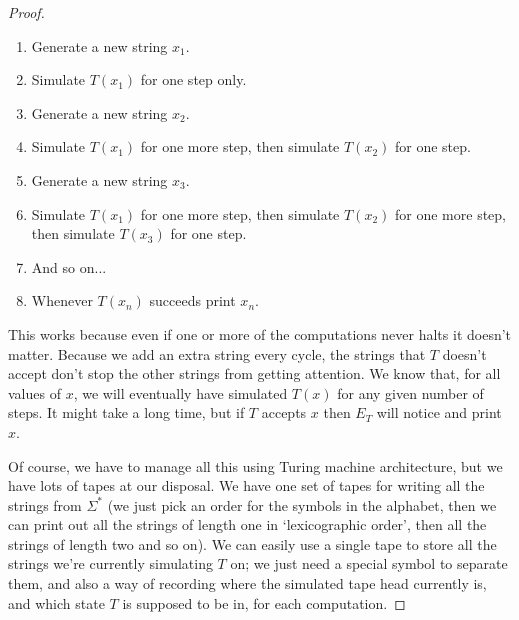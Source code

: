 \documentclass{article}
\theoremstyle{plain}
\theoremstyle{definition}
\begin{document}
\begin{proof}
\begin{enumerate}
\item Generate a new string $x_1$.
\item Simulate $T(x_1)$ for one step only.
\item Generate a new string $x_2$.
\item Simulate $T(x_1)$ for one more step, then simulate $T(x_2)$ for one step.
\item Generate a new string $x_3$.
\item Simulate $T(x_1)$ for one more step, then simulate $T(x_2)$ for one more step, then simulate $T(x_3)$ for one step.
\item And so on...
\item Whenever $T(x_n)$ succeeds print $x_n$. 
\end{enumerate}
This works because even if one or more of the computations never halts it doesn't matter. Because we add an extra string every cycle, the strings that $T$ doesn't accept don't stop the other strings from getting attention. We know that, for all values of $x$, we will eventually have simulated $T(x)$ for any given number of steps. It might take a long time, but if $T$ accepts $x$ then $E_T$ will notice and print $x$. 

Of course, we have to manage all this using Turing machine architecture, but we have lots of tapes at our disposal. We have one set of tapes for writing all the strings from $\Sigma^*$ (we just pick an order for the symbols in the alphabet, then we can print out all the strings of length one in `lexicographic order', then all the strings of length two and so on). We can easily use a single tape to store all the strings we're currently simulating $T$ on; we just need a special symbol to separate them, and also a way of recording where the simulated tape head currently is, and which state $T$ is supposed to be in, for each computation. 
\end{proof}
\end{document}
